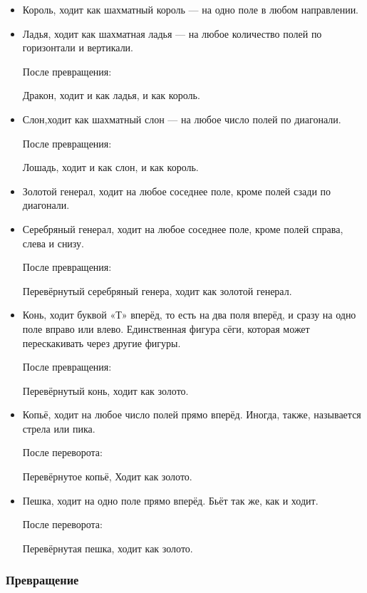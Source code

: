 \begin{itemize}
	\item Король, 
	 ходит как шахматный король — на одно поле в любом направлении.
	 
	\item Ладья, ходит как шахматная ладья — на любое количество полей по горизонтали и 	     вертикали.

	 После превращения:

     Дракон, ходит и как ладья, и как король.

	\item Слон,ходит как шахматный слон — на любое число полей по диагонали.

	 После превращения:

	 Лошадь, ходит и как слон, и как король.

	\item Золотой генерал, ходит на любое соседнее поле, кроме полей сзади по диагонали.

	\item Серебряный генерал, ходит на любое соседнее поле, кроме полей справа, слева и 	 	 снизу.

	 После превращения:

	 Перевёрнутый серебряный генера, ходит как золотой генерал.

	\item Конь, ходит буквой «Т» вперёд, то есть на два поля вперёд, и сразу на одно поле 		 вправо или влево. Единственная фигура сёги, которая может перескакивать через другие 		 фигуры.

	 После превращения:

     Перевёрнутый конь, ходит как золото.

	\item Копьё, ходит на любое число полей прямо вперёд. Иногда, также, называется стрела 	 или пика.

	 После переворота:

	 Перевёрнутое копьё, Ходит как золото.

    \item Пешка, ходит на одно поле прямо вперёд. Бьёт так же, как и ходит.

	 После переворота:

	 Перевёрнутая пешка, ходит как золото.
	
\end{itemize}

\subsubsection{Превращение}

